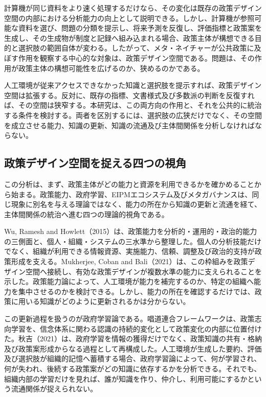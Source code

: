 計算機が同じ資料をより速く処理するだけなら、その変化は既存の政策デザイン空間の内部における分析能力の向上として説明できる。しかし、計算機が参照可能な資料を選び、問題の分類を提示し、将来予測を反復し、評価指標と政策案を生成し、その生成物が制度と記録へ組み込まれる場合、政策主体が構想できる目的と選択肢の範囲自体が変わる。したがって、メタ・ネイチャーが公共政策に及ぼす作用を観察する中心的な対象は、政策デザイン空間である。問題は、その作用が政策主体の構想可能性を広げるのか、狭めるのかである。

人工環境が従来アクセスできなかった知識と選択肢を提示すれば、政策デザイン空間は拡張する。反対に、既存の指標、文書様式及び多数派の判断を反復すれば、その空間は狭窄する。本研究は、この両方向の作用と、それを公共的に統治する条件を検討する。両者を区別するには、選択肢の広狭だけでなく、その空間を成立させる能力、知識の更新、知識の流通及び主体間関係を分析しなければならない。

\subsection{政策デザイン空間を捉える四つの視角}
\label{subsec:intro_four_lenses}

この分析は、まず、政策主体がどの能力と資源を利用できるかを確かめることから始まる。政策能力、政府学習、EIPMエコシステム及びメタガバナンスは、同じ現象に別名を与える理論ではなく、能力の所在から知識の更新と流通を経て、主体間関係の統治へ進む四つの理論的視角である。

Wu, Ramesh and Howlett（2015）は、政策能力を分析的・運用的・政治的能力の三側面と、個人・組織・システムの三水準から整理した\cite{wu2015policycapacity}。個人の分析技能だけでなく、組織が利用できる情報資源、実施能力、信頼、調整及び政治的支持が政策形成を支える。Mukherjee, Coban and Bali（2021）は、この枠組みを政策デザイン空間へ接続し、有効な政策デザインが複数水準の能力に支えられることを示した\cite{mukherjee2021policycapacities}。政策能力論によって、人工環境が能力を補完するのか、特定の組織へ能力を集中させるのかを検討できる。しかし、能力の所在を確認するだけでは、政策に用いる知識がどのように更新されるかは分からない。

この更新過程を扱うのが政府学習論である。唱道連合フレームワークは、政策志向学習を、信念体系に関わる認識の持続的変化として政策変化の内部に位置付けた\cite{sabatier1988}。秋吉（2021）は、政府学習を情報の獲得だけでなく、政策知識の共有・格納及び政策案形成からなる過程として再構成した\cite{akiyoshi2021governmentlearning}。人工環境が生成した要約、評価及び選択肢が組織的記憶へ蓄積する場合、政府学習論によって、何が学習され、何が失われ、後続する政策案がどの知識に依存するかを分析できる。それでも、組織内部の学習だけを見れば、誰が知識を作り、仲介し、利用可能にするかという流通関係が捉えられない。

